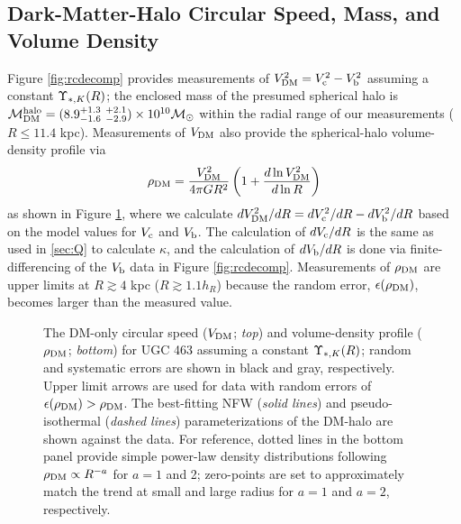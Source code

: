 \documentclass[apj,iop,numberedappendix]{emulateapj}
\begin{document}
\subsection{Dark-Matter-Halo Circular Speed, Mass, and Volume Density}
\label{sec:rhodm}

Figure \ref{fig:rcdecomp} provides measurements of $V_{\rm DM}^2 = V_{\rm c}^2 - V_{\rm b}^2$
assuming a constant $\Upsilon_{\ast,K}(R)$; the enclosed mass of the presumed spherical halo is
$\mathcal{M}^{\rm halo}_{\rm DM} = (8.9^{+1.3}_{-1.6}\ ^{+2.1}_{-2.9})\times 10^{10} \mathcal{M}_\odot$ within the
radial range of our measurements ($R \leq 11.4$ kpc).  Measurements of $V_{\rm DM}$
also provide the spherical-halo volume-density profile via
%
\begin{equation}
%
\rhodm = \frac{\vdm^2}{4\pi GR^2} \left( 1 + \frac{d\ln\vdm^2}{d\ln R} \right)
%
\label{eq:rhodm}
%
\end{equation}
%
\citep{2001ApJ...552L..23D, 2003ApJ...583..732S} as shown in Figure
\ref{fig:rhodm}, where we calculate $dV_{\rm DM}^2/dR = dV_{\rm c}^2/dR - dV_{\rm b}^2/dR$
based on the model values for $V_{\rm c}$ and $V_{\rm b}$.  The calculation of $dV_{\rm c}/dR$
is the same as used in \sect \ref{sec:Q} to calculate $\kappa$, and the
calculation of $dV_{\rm b}/dR$ is done via finite-differencing of the $V_{\rm b}$ data
in Figure \ref{fig:rcdecomp}.  Measurements of $\rho_{\rm DM}$ are upper limits at
$R\gtrsim 4$ kpc ($R\gtrsim 1.1h_R$) because the random error,
$\epsilon(\rho_{\rm DM})$, becomes larger than the measured value.

\begin{figure}
\caption{
%
The DM-only circular speed ($V_{\rm DM}$; {\it top}) and volume-density profile
($\rho_{\rm DM}$; {\it bottom}) for UGC 463 assuming a constant $\Upsilon_{\ast,K}(R)$; random and
systematic errors are shown in black and gray, respectively.  Upper limit arrows
are used for data with random errors of $\epsilon(\rho_{\rm DM}) > \rho_{\rm DM}$.  The
best-fitting  NFW ({\it solid lines}) and pseudo-isothermal ({\it dashed lines})
parameterizations of the DM-halo are shown against the data.  For reference,
dotted lines in the bottom panel provide simple power-law density distributions
following $\rho_{\rm DM} \propto R^{-a}$ for $a=1$ and 2; zero-points are set to
approximately match the trend at small and large radius for $a = 1$ and $a = 2$,
respectively.
%
}
\label{fig:rhodm}
\end{figure}
\end{document}
